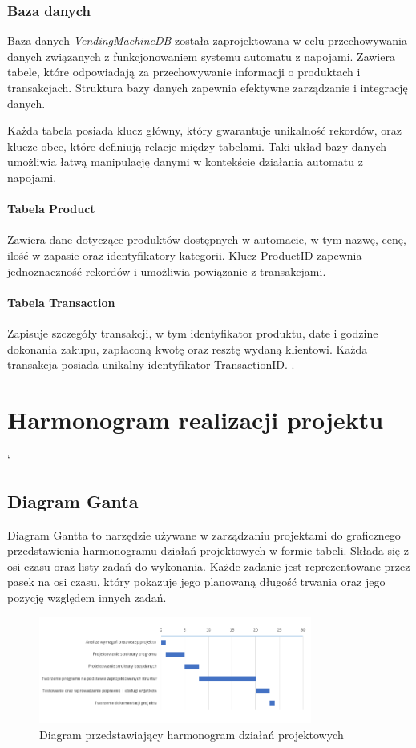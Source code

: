 \subsection{Baza danych}
Baza danych \textit{VendingMachineDB} została zaprojektowana w celu przechowywania danych związanych z funkcjonowaniem systemu automatu z napojami. Zawiera tabele, które odpowiadają za przechowywanie informacji o produktach i transakcjach. Struktura bazy danych zapewnia efektywne zarządzanie i integrację danych.

Każda tabela posiada klucz główny, który gwarantuje unikalność rekordów, oraz klucze obce, które definiują relacje między tabelami. Taki układ bazy danych umożliwia łatwą manipulację danymi w kontekście działania automatu z napojami.

\subsubsection*{Tabela Product}
Zawiera dane dotyczące produktów dostępnych w automacie, w tym nazwę, cenę, ilość w zapasie oraz identyfikatory kategorii. Klucz ProductID zapewnia jednoznaczność rekordów i umożliwia powiązanie z transakcjami.

\subsubsection*{Tabela Transaction}
Zapisuje szczegóły transakcji, w tym identyfikator produktu, date i godzine dokonania zakupu, zapłaconą kwotę oraz resztę wydaną klientowi. Każda transakcja posiada unikalny identyfikator TransactionID.
.


\newpage
\chapter{Harmonogram realizacji projektu}

`\section{Diagram Ganta}
Diagram Gantta to narzędzie używane w zarządzaniu projektami do graficznego przedstawienia harmonogramu działań projektowych w formie tabeli. Składa się z osi czasu oraz listy zadań do wykonania. Każde zadanie jest reprezentowane przez pasek na osi czasu, który pokazuje jego planowaną długość trwania oraz jego pozycję względem innych zadań. 
\begin{figure}[H] %
    \centering
    \includegraphics[width=0.8\textwidth]{grafiki/diag_ganta.PNG}
    \caption{\footnotesize Diagram przedstawiający harmonogram działań projektowych \cite{www-2}}
	\label{fig:plotend}
\end{figure}
\newpage
